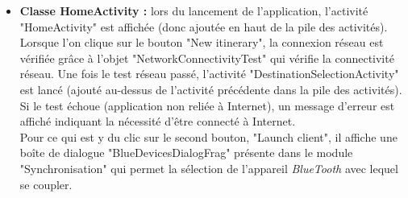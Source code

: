 \begin{itemize}
\item \textbf{Classe HomeActivity :} lors du lancement de l'application, l'activité "HomeActivity" est affichée (donc ajoutée en haut de la pile des activités). Lorsque l'on clique sur le bouton "New itinerary", la connexion réseau est vérifiée grâce à l'objet "NetworkConnectivityTest" qui vérifie la connectivité réseau. Une fois le test réseau passé, l'activité "DestinationSelectionActivity" est lancé (ajouté au-dessus de l'activité précédente dans la pile des activités). Si le test échoue (application non reliée à Internet), un message d'erreur est affiché indiquant la nécessité d'être connecté à Internet.\\ Pour ce qui est y du clic sur le second bouton, "Launch client", il affiche une boîte de dialogue "BlueDevicesDialogFrag" présente dans le module "Synchronisation" qui permet la sélection de l'appareil \textit{BlueTooth} avec lequel se coupler.\\


\end{itemize}
